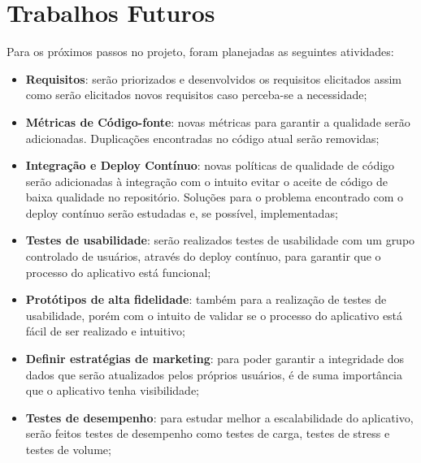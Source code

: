 \section{Trabalhos Futuros}

Para os próximos passos no projeto, foram planejadas as seguintes atividades:

\begin{itemize}
    \item \textbf{Requisitos}: serão priorizados e desenvolvidos os requisitos elicitados assim como serão elicitados novos requisitos caso perceba-se a necessidade;
    \item \textbf{Métricas de Código-fonte}: novas métricas para garantir a qualidade serão adicionadas. Duplicações encontradas no código atual serão removidas;
    \item \textbf{Integração e Deploy Contínuo}: novas políticas de qualidade de código serão adicionadas à integração com o intuito evitar o aceite de código de baixa qualidade no repositório. Soluções para o problema encontrado com o deploy contínuo serão estudadas e, se possível, implementadas;
    \item \textbf{Testes de usabilidade}: serão realizados testes de usabilidade com um grupo controlado de usuários, através do deploy contínuo, para garantir que o processo do aplicativo está funcional;
    \item \textbf{Protótipos de alta fidelidade}: também para a realização de testes de usabilidade, porém com o intuito de validar se o processo do aplicativo está fácil de ser realizado e intuitivo;
    \item \textbf{Definir estratégias de marketing}: para poder garantir a integridade dos dados que serão atualizados pelos próprios usuários, é de suma importância que o aplicativo tenha visibilidade;
    \item \textbf{Testes de desempenho}: para estudar melhor a escalabilidade do aplicativo, serão feitos testes de desempenho como testes de carga, testes de stress e testes de volume;
\end{itemize}

